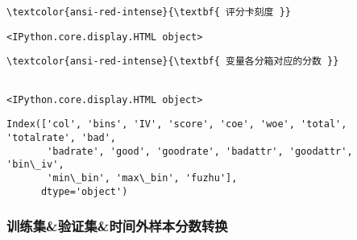 \documentclass[11pt]{article}
\begin{document}
    \begin{Verbatim}[commandchars=\\\{\}]
\textcolor{ansi-red-intense}{\textbf{ 评分卡刻度 }}

    \end{Verbatim}

    
    \begin{verbatim}
<IPython.core.display.HTML object>
    \end{verbatim}

    
    \begin{Verbatim}[commandchars=\\\{\}]
\textcolor{ansi-red-intense}{\textbf{ 变量各分箱对应的分数 }}


    \end{Verbatim}

    
    \begin{verbatim}
<IPython.core.display.HTML object>
    \end{verbatim}

    
    \begin{Verbatim}[commandchars=\\\{\}]
Index(['col', 'bins', 'IV', 'score', 'coe', 'woe', 'total', 'totalrate', 'bad',
       'badrate', 'good', 'goodrate', 'badattr', 'goodattr', 'bin\_iv',
       'min\_bin', 'max\_bin', 'fuzhu'],
      dtype='object')

    \end{Verbatim}

    \subsubsection{训练集\&验证集\&时间外样本分数转换}\label{ux8badux7ec3ux96c6ux9a8cux8bc1ux96c6ux65f6ux95f4ux5916ux6837ux672cux5206ux6570ux8f6cux6362}
\end{document}
